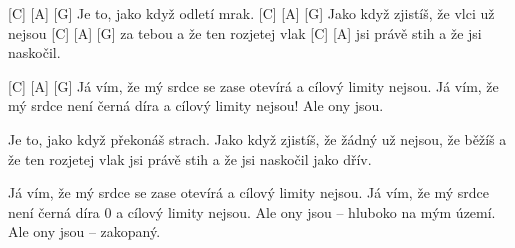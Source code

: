 
[C] [A] [G]
Je to, jako když odletí mrak. 
[C] [A] [G]
Jako když zjistíš, že vlci už nejsou 
[C] [A] [G]
za tebou a že ten rozjetej vlak 
[C] [A] 
jsi právě stih a že jsi naskočil. 

[C] [A] [G]
Já vím, že mý srdce se zase otevírá 
a cílový limity nejsou. 
Já vím, že mý srdce není černá díra
a cílový limity nejsou! Ale ony jsou. 

Je to, jako když překonáš strach. 
Jako když zjistíš, že žádný už nejsou, 
že běžíš a že ten rozjetej vlak jsi právě stih 
a že jsi naskočil jako dřív. 

Já vím, že mý srdce se zase otevírá 
a cílový limity nejsou. 
Já vím, že mý srdce není černá díra 0
a cílový limity nejsou. 
Ale ony jsou – hluboko na mým území. 
Ale ony jsou – zakopaný.
